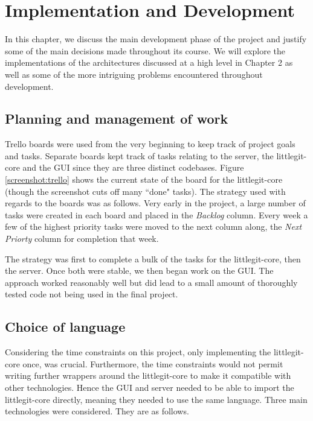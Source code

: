\chapter{Implementation and Development}

In this chapter, we discuss the main development phase of the project and justify some of the main decisions made throughout its course. We will explore the implementations of the architectures discussed at a high level in Chapter 2 as well as some of the more intriguing problems encountered throughout development.


\section{Planning and management of work}


Trello boards were used from the very beginning to keep track of project goals and tasks. Separate boards kept track of tasks relating to the server, the littlegit-core and the GUI since they are three distinct codebases. Figure \ref{screenshot:trello} shows the current state of the board for the littlegit-core (though the screenshot cuts off many ``done" tasks). The strategy used with regards to the boards was as follows. Very early in the project, a large number of tasks were created in each board and placed in the \emph{Backlog} column. Every week a few of the highest priority tasks were moved to the next column along, the \emph{Next Priorty} column for completion that week. 


The strategy was first to complete a bulk of the tasks for the littlegit-core, then the server. Once both were stable, we then began work on the GUI. The approach worked reasonably well but did lead to a small amount of thoroughly tested code not being used in the final project.



\section{Choice of language}

Considering the time constraints on this project, only implementing the littlegit-core once, was crucial. Furthermore, the time constraints would not permit writing further wrappers around the littlegit-core to make it compatible with other technologies. Hence the GUI and server needed to be able to import the littlegit-core directly, meaning they needed to use the same language. Three main technologies were considered. They are as follows.

